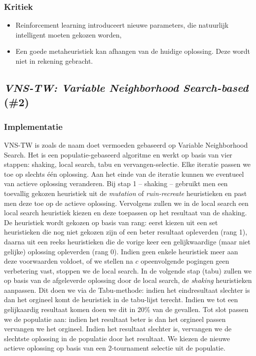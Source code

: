 \subsubsection{Kritiek}
\begin{itemize}
 \item Reinforcement learning introduceert nieuwe parameters, die natuurlijk intelligent moeten gekozen worden,
 \item Een goede metaheuristiek kan afhangen van de huidige oplossing. Deze wordt niet in rekening gebracht.
\end{itemize}
\subsection{\emph{VNS-TW: Variable Neighborhood Search-based} (\#2)}
\label{sss:vns-tw}
\subsubsection{Implementatie}
VNS-TW\cite{chesc-vns-tw} is zoals de naam doet vermoeden gebaseerd op Variable Neighborhood Search. Het is een populatie-gebaseerd algoritme en werkt op basis van vier stappen: shaking, local search, tabu en vervangen-selectie. Elke iteratie passen we toe op slechts \'e\'en oplossing. Aan het einde van de iteratie kunnen we eventueel van actieve oplossing veranderen. Bij stap 1 -- shaking -- gebruikt men een toevallig gekozen heuristiek uit de \emph{mutation} of \emph{ruin-recreate} heuristieken en past men deze toe op de actieve oplossing. Vervolgens zullen we in de local search een local search heuristiek kiezen en deze toepassen op het resultaat van de shaking. De heuristiek wordt gekozen op basis van rang: eerst kiezen uit een set heuristieken die nog niet gekozen zijn of een beter resultaat opleverden (rang 1), daarna uit een reeks heuristieken die de vorige keer een gelijkwaardige (maar niet gelijke) oplossing opleverden (rang 0). Indien geen enkele heuristiek meer aan deze 
voorwaarden voldoet, of we stellen na $c$ opeenvolgende pogingen geen verbetering vast, stoppen we de local search. In de volgende stap (tabu) zullen we op basis van de afgeleverde oplossing door de local search, de \emph{shaking} heuristieken aanpassen. Dit doen we via de Tabu-methode\cite{journals/heuristics/BurkeKS03}: indien het eindresultaat slechter is dan het orgineel komt de heuristiek in de tabu-lijst terecht. Indien we tot een gelijkaardig resultaat komen doen we dit in 20\% van de gevallen. Tot slot passen we de populatie aan: indien het resultaat beter is dan het orgineel passen vervangen we het orgineel. Indien het resultaat slechter is, vervangen we de slechtste oplossing in de populatie door het resultaat. We kiezen de nieuwe actieve oplossing op basis van een 2-tournament selectie uit de populatie.
